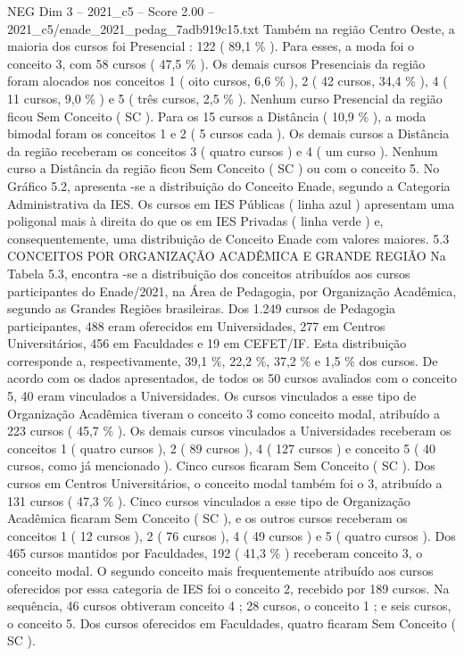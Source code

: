 \begin{textsample}{NEG Dim 3 – 2021\_c5 – Score 2.00 – 2021\_c5/enade\_2021\_pedag\_7adb919c15.txt}
Também na região Centro Oeste, a maioria dos cursos foi Presencial : 122 ( 89,1 \% ).
Para esses, a moda foi o conceito 3, com 58 cursos ( 47,5 \% ).
Os demais cursos Presenciais da região foram alocados nos conceitos 1 ( oito cursos, 6,6 \% ), 2 ( 42 cursos, 34,4 \% ), 4 ( 11 cursos, 9,0 \% ) e 5 ( três cursos, 2,5 \% ).
Nenhum curso Presencial da região ficou Sem Conceito ( SC ).
Para os 15 cursos a Distância ( 10,9 \% ), a moda bimodal foram os conceitos 1 e 2 ( 5 cursos cada ).
Os demais cursos a Distância da região receberam os conceitos 3 ( quatro cursos ) e 4 ( um curso ).
Nenhum curso a Distância da região ficou Sem Conceito ( SC ) ou com o conceito 5.
No Gráfico 5.2, apresenta -se a distribuição do Conceito Enade, segundo a Categoria Administrativa da IES.
Os cursos em IES Públicas ( linha azul ) apresentam uma poligonal mais à direita do que os em IES Privadas ( linha verde ) e, consequentemente, uma distribuição de Conceito Enade com valores maiores. 5.3 CONCEITOS POR ORGANIZAÇÃO ACADÊMICA E GRANDE REGIÃO Na Tabela 5.3, encontra -se a distribuição dos conceitos atribuídos aos cursos participantes do Enade/2021, na Área de Pedagogia, por Organização Acadêmica, segundo as Grandes Regiões brasileiras.
Dos 1.249 cursos de Pedagogia participantes, 488 eram oferecidos em Universidades, 277 em Centros Universitários, 456 em Faculdades e 19 em CEFET/IF.
Esta distribuição corresponde a, respectivamente, 39,1 \%, 22,2 \%, 37,2 \% e 1,5 \% dos cursos.
De acordo com os dados apresentados, de todos os 50 cursos avaliados com o conceito 5, 40 eram vinculados a Universidades.
Os cursos vinculados a esse tipo de Organização Acadêmica tiveram o conceito 3 como conceito modal, atribuído a 223 cursos ( 45,7 \% ).
Os demais cursos vinculados a Universidades receberam os conceitos 1 ( quatro cursos ), 2 ( 89 cursos ), 4 ( 127 cursos ) e conceito 5 ( 40 cursos, como já mencionado ).
Cinco cursos ficaram Sem Conceito ( SC ).
Dos cursos em Centros Universitários, o conceito modal também foi o 3, atribuído a 131 cursos ( 47,3 \% ).
Cinco cursos vinculados a esse tipo de Organização Acadêmica ficaram Sem Conceito ( SC ), e os outros cursos receberam os conceitos 1 ( 12 cursos ), 2 ( 76 cursos ), 4 ( 49 cursos ) e 5 ( quatro cursos ).
Dos 465 cursos mantidos por Faculdades, 192 ( 41,3 \% ) receberam conceito 3, o conceito modal.
O segundo conceito mais frequentemente atribuído aos cursos oferecidos por essa categoria de IES foi o conceito 2, recebido por 189 cursos.
Na sequência, 46 cursos obtiveram conceito 4 ; 28 cursos, o conceito 1 ; e seis cursos, o conceito 5.
Dos cursos oferecidos em Faculdades, quatro ficaram Sem Conceito ( SC ).

\end{textsample}
